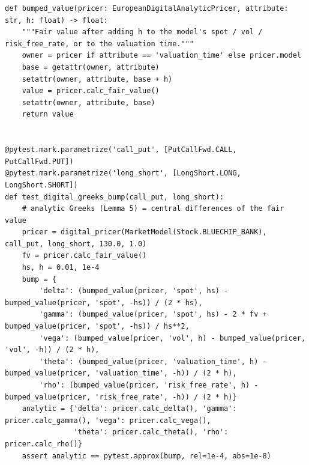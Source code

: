 \documentclass[11pt,a4paper]{article}
\begin{document}
\begin{lstlisting}[style=pysmall]
def bumped_value(pricer: EuropeanDigitalAnalyticPricer, attribute: str, h: float) -> float:
    """Fair value after adding h to the model's spot / vol / risk_free_rate, or to the valuation time."""
    owner = pricer if attribute == 'valuation_time' else pricer.model
    base = getattr(owner, attribute)
    setattr(owner, attribute, base + h)
    value = pricer.calc_fair_value()
    setattr(owner, attribute, base)
    return value


@pytest.mark.parametrize('call_put', [PutCallFwd.CALL, PutCallFwd.PUT])
@pytest.mark.parametrize('long_short', [LongShort.LONG, LongShort.SHORT])
def test_digital_greeks_bump(call_put, long_short):
    # analytic Greeks (Lemma 5) = central differences of the fair value
    pricer = digital_pricer(MarketModel(Stock.BLUECHIP_BANK), call_put, long_short, 130.0, 1.0)
    fv = pricer.calc_fair_value()
    hs, h = 0.01, 1e-4
    bump = {
        'delta': (bumped_value(pricer, 'spot', hs) - bumped_value(pricer, 'spot', -hs)) / (2 * hs),
        'gamma': (bumped_value(pricer, 'spot', hs) - 2 * fv + bumped_value(pricer, 'spot', -hs)) / hs**2,
        'vega': (bumped_value(pricer, 'vol', h) - bumped_value(pricer, 'vol', -h)) / (2 * h),
        'theta': (bumped_value(pricer, 'valuation_time', h) - bumped_value(pricer, 'valuation_time', -h)) / (2 * h),
        'rho': (bumped_value(pricer, 'risk_free_rate', h) - bumped_value(pricer, 'risk_free_rate', -h)) / (2 * h)}
    analytic = {'delta': pricer.calc_delta(), 'gamma': pricer.calc_gamma(), 'vega': pricer.calc_vega(),
                'theta': pricer.calc_theta(), 'rho': pricer.calc_rho()}
    assert analytic == pytest.approx(bump, rel=1e-4, abs=1e-8)
\end{lstlisting}

\begin{center}\begin{minipage}{\linewidth}\centering
{}
\label{fig:tests}
\end{minipage}\end{center}
\end{document}
